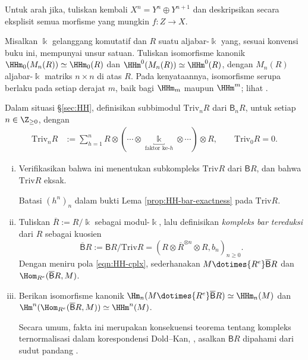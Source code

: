 \begin{Exercises}
\begin{hint}
		Untuk arah jika, tuliskan kembali
		$X^n=Y^n\oplus Y^{n+1}$ dan deskripsikan secara eksplisit semua
		morfisme yang mungkin $f:Z\to X$.
	\end{hint}

	\item Misalkan $\Bbbk$ gelanggang komutatif dan $R$ suatu
	aljabar-$\Bbbk$ yang, sesuai konvensi buku ini, mempunyai unsur satuan.
	Tuliskan isomorfisme kanonik
	$\HHm_0(M_n(R))\simeq\HHm_0(R)$ dan
	$\HHm^0(M_n(R))\simeq\HHm^0(R)$, dengan $M_n(R)$ aljabar-$\Bbbk$ matriks
	$n\times n$ di atas $R$. Pada kenyataannya, isomorfisme serupa berlaku
	pada setiap derajat $m$, baik bagi $\HHm_m$ maupun $\HHm^m$; lihat
	\cite[Teorema 1.2.4]{Lo98}.

	\item Dalam situasi \S\ref{sec:HH}, definisikan subbimodul
	$\mathrm{Triv}_nR$ dari $\mathsf{B}_nR$, untuk setiap
	$n\in\Z_{\geq0}$, dengan
	\begin{align*}
		\mathrm{Triv}_nR
		&:=\sum_{h=1}^n
		R\otimes
		(\cdots\otimes
		\underbracket{\;\Bbbk\;}_{\text{faktor ke-$h$}}
		\otimes\cdots)\otimes R,
		\qquad \mathrm{Triv}_0R=0.
	\end{align*}
	\begin{enumerate}[(i)]
		\item Verifikasikan bahwa ini menentukan subkompleks
		$\mathrm{Triv}R$ dari $\mathsf{B}R$, dan bahwa $\mathrm{Triv}R$ eksak.
		\begin{hint}
			Batasi $(h^n)_n$ dalam bukti Lema
			\ref{prop:HH-bar-exactness} pada $\mathrm{Triv}R$.
		\end{hint}
		\item Tuliskan $\overline R:=R/\Bbbk$ sebagai modul-$\Bbbk$, lalu
		definisikan \emph{kompleks bar tereduksi} dari $R$ sebagai kuosien
		\[
			\overline{\mathsf{B}}R
			:=\mathsf{B}R/\mathrm{Triv}R
			=\left(R\otimes\overline R^{\otimes n}\otimes R,b_n\right)_{n\geq0}.
		\]
		Dengan meniru pola \eqref{eqn:HH-cplx}, sederhanakan
		$M\dotimes{R^e}\overline{\mathsf{B}}R$ dan
		$\Hom_{R^e}(\overline{\mathsf{B}}R,M)$.
		\item Berikan isomorfisme kanonik
		$\Hm_n(M\dotimes{R^e}\overline{\mathsf{B}}R)\simeq\HHm_n(M)$ dan
		$\Hm^n(\Hom_{R^e}(\overline{\mathsf{B}}R,M))\simeq\HHm^n(M)$.
		\begin{hint}
			Secara umum, fakta ini merupakan konsekuensi teorema tentang
			kompleks ternormalisasi dalam korespondensi Dold--Kan,
			, asalkan
			$\mathsf{B}R$ dipahami dari sudut pandang
			.
		\end{hint}
	\end{enumerate}


\end{Exercises}
